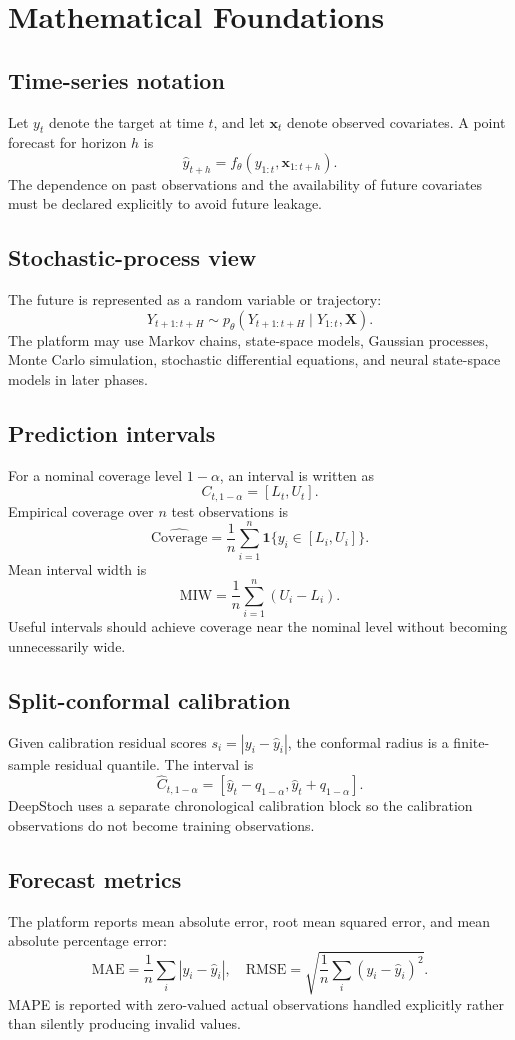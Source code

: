 \documentclass[11pt,a4paper]{report}
\begin{document}
\chapter{Mathematical Foundations}
\section{Time-series notation}
Let $y_t$ denote the target at time $t$, and let $\mathbf{x}_t$ denote observed covariates. A point forecast for horizon $h$ is
\[
\widehat{y}_{t+h}=f_\theta(y_{1:t},\mathbf{x}_{1:t+h}).
\]
The dependence on past observations and the availability of future covariates must be declared explicitly to avoid future leakage.

\section{Stochastic-process view}
The future is represented as a random variable or trajectory:
\[
Y_{t+1:t+H}\sim p_\theta(Y_{t+1:t+H}\mid Y_{1:t},\mathbf{X}).
\]
The platform may use Markov chains, state-space models, Gaussian processes, Monte Carlo simulation, stochastic differential equations, and neural state-space models in later phases.

\section{Prediction intervals}
For a nominal coverage level $1-\alpha$, an interval is written as
\[
C_{t,1-\alpha}=[L_t,U_t].
\]
Empirical coverage over $n$ test observations is
\[
\widehat{\mathrm{Coverage}}=\frac{1}{n}\sum_{i=1}^{n}\mathbf{1}\{y_i\in[L_i,U_i]\}.
\]
Mean interval width is
\[
\mathrm{MIW}=\frac{1}{n}\sum_{i=1}^{n}(U_i-L_i).
\]
Useful intervals should achieve coverage near the nominal level without becoming unnecessarily wide.

\section{Split-conformal calibration}
Given calibration residual scores $s_i=|y_i-\widehat{y}_i|$, the conformal radius is a finite-sample residual quantile. The interval is
\[
\widehat{C}_{t,1-\alpha}=[\widehat{y}_t-q_{1-\alpha},\widehat{y}_t+q_{1-\alpha}].
\]
DeepStoch uses a separate chronological calibration block so the calibration observations do not become training observations.

\section{Forecast metrics}
The platform reports mean absolute error, root mean squared error, and mean absolute percentage error:
\[
\mathrm{MAE}=\frac{1}{n}\sum_i|y_i-\widehat{y}_i|,
\quad
\mathrm{RMSE}=\sqrt{\frac{1}{n}\sum_i(y_i-\widehat{y}_i)^2}.
\]
MAPE is reported with zero-valued actual observations handled explicitly rather than silently producing invalid values.
\end{document}
